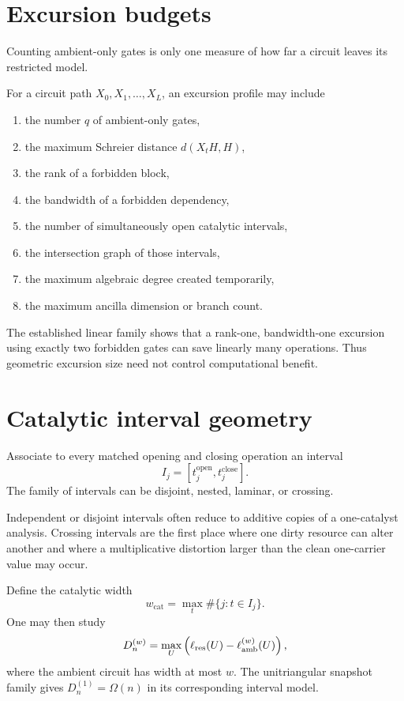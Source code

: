 \section{Excursion budgets}
Counting ambient-only gates is only one measure of how far a circuit leaves its restricted model.
\begin{definition}
For a circuit path $X_0,X_1,\ldots,X_L$, an excursion profile may include
\begin{enumerate}
\item the number $q$ of ambient-only gates,
\item the maximum Schreier distance $d(X_tH,H)$,
\item the rank of a forbidden block,
\item the bandwidth of a forbidden dependency,
\item the number of simultaneously open catalytic intervals,
\item the intersection graph of those intervals,
\item the maximum algebraic degree created temporarily,
\item the maximum ancilla dimension or branch count.
\end{enumerate}
\end{definition}
The established linear family shows that a rank-one, bandwidth-one excursion using exactly two forbidden gates can save linearly many operations.  Thus geometric excursion size need not control computational benefit.

\section{Catalytic interval geometry}
Associate to every matched opening and closing operation an interval
\[
I_j=[t_j^{\mathrm{open}},t_j^{\mathrm{close}}].
\]
The family of intervals can be disjoint, nested, laminar, or crossing.

\begin{principle}
Independent or disjoint intervals often reduce to additive copies of a one-catalyst analysis.  Crossing intervals are the first place where one dirty resource can alter another and where a multiplicative distortion larger than the clean one-carrier value may occur.
\end{principle}

Define the catalytic width
\[
w_{\mathrm{cat}}=
\max_t
\#\{j:t\in I_j\}.
\]
One may then study
\[
D_n^{(w)}
=
\max_{U}
\left(
\ell_{\mathrm{res}}(U)-\ell_{\mathrm{amb}}^{(w)}(U)
\right),
\]
where the ambient circuit has width at most $w$.  The unitriangular snapshot family gives $D_n^{(1)}=\Omega(n)$ in its corresponding interval model.

